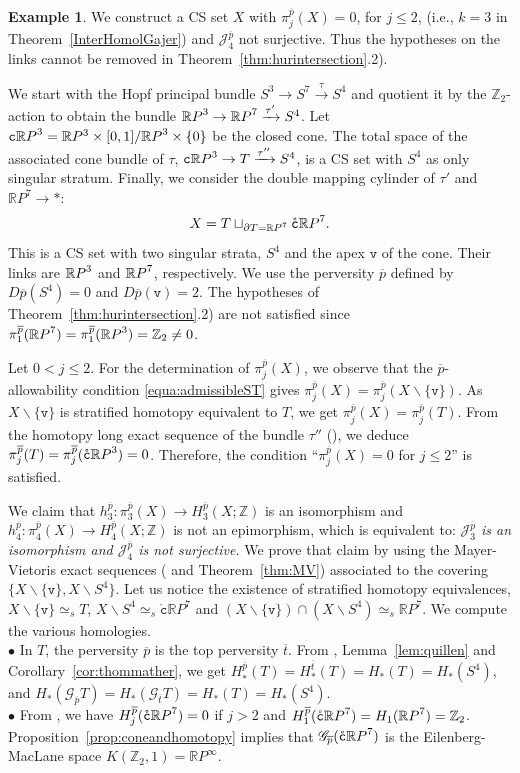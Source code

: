 \documentclass[a4paper,10pt,english,reqno]{amsart}
\theoremstyle{plain}
\theoremstyle{definition}
\newtheorem{example}[proposition]{Example}
\theoremstyle{remark}
\numberwithin{equation}{section}
\newcommand{\thmref}[1]{Theorem~\ref{#1}}
\newcommand{\propref}[1]{Proposition~\ref{#1}}
\newcommand{\lemref}[1]{Lemma~\ref{#1}}
\newcommand{\corref}[1]{Corollary~\ref{#1}}
\def\R{{\mathbb R}}
\def\ov{\overline}
\def\cJ{{\mathcal J}}
\def\crG{{\mathscr G}}
\def\tc{{\mathtt c}}
\def\tv{{\mathtt v}}
\def\R{\mathbb{R}}
\def\Z{\mathbb{Z}}
\def\RP{{\mathbb{R}{\rm P}}}
\def\rc{{\mathring{\tc}}}
\def\menos{\backslash}
\renewcommand\1{\hbox{\ding{192}}}
\renewcommand\2{\hbox{\ding{193}}}
\newcommand\3{\hbox{\ding{194}}}
\newcommand\4{\hbox{\ding{195}}}
\begin{document}
\begin{example}\label{exem:pashurewicz}
We construct a CS set $X$  with $\pi_{j}^{\ov{p}}(X)=0$, for $j\leq 2$, (i.e., $k=3$ in \thmref{InterHomolGajer})
and $\cJ^{\ov{p}}_{4}$ not surjective. Thus the hypotheses on the links cannot be removed in
\thmref{thm:hurintersection}.2). 

We start with the Hopf principal bundle $S^3 \to S^7  \xrightarrow{\tau}  S^4$ and  quotient it
by the $\Z_2$-action to obtain the bundle $\RP^3 \to \RP^7  \xrightarrow{\tau'} S^4$.
Let $\tc \RP^3=\R P^3\times [0,1]/\RP^3\times\{0\}$ be the closed cone.
The total space of the associated cone bundle of $\tau$,  $\tc \RP^3 \to T \xrightarrow{\tau''}  S^4$,
 is  a CS set with $S^4$ as  only singular stratum. 
Finally, we consider the double mapping cylinder of 
%
$\tau'$
and $\R P^7\to *$: 
$$
X = T \sqcup_{\partial T= \RP^7} \rc \RP^7.
$$
This is  a CS set with two singular strata, $S^4$ and the apex $\tv$ of the cone.
Their links are $\RP^3$ and  $\RP^7$, respectively.
 We use the  perversity $ \ov p$ defined by  $D\ov p (S^4) = 0$ and $D\ov p(\tv) = 2$.
 The hypotheses of \thmref{thm:hurintersection}.2) are not satisfied since
$
 \pi^{\ov p}_1(\RP^7) =  \pi^{\ov p}_1(\RP^3) = \Z_2\ne 0
 $.
 
 Let $0<j\leq 2$.
 For the determination of $\pi_{j}^{\ov{p}}(X)$, we observe that the
 $\ov p$-allowability condition  \eqref{equa:admissibleST} gives
$
\pi^{\ov p}_{j} (X) \stackrel {} = \pi^{\ov p}_{j}(X\menos \{\tv\} )$.
 As $X\menos\{\tv\}$ is stratified homotopy equivalent
to $T$, we get  $\pi^{\ov p}_{j} (X)= \pi^{\ov p}_{j}(T )$.
%
From the homotopy long exact sequence of the bundle $\tau''$ (\cite[Theorem 2.2]{MR1404919}), 
we deduce
$\pi_{j}^{\ov p} (T)=\pi_j^{\ov p} (\rc \RP^3)=0$. 
Therefore, the condition ``$\pi_{j}^{\ov p} (X)=0$ for $j\leq 2$''  is satisfied.

We claim that $h_{3}^{\ov{p}}\colon \pi_{3}^{\ov{p}}(X )\to {H}_{3}^{\ov{p}}(X;\Z)$ is  an isomorphism
and
$h_{4}^{\ov{p}}\colon \pi_{4}^{\ov{p}}(X )\to {H}_{4}^{\ov{p}}(X;\Z)$ is not an epimorphism, which is equivalent to:
 \emph{$  \cJ^{\ov{p}}_{3} $ is  an isomorphism and $  \cJ^{\ov{p}}_{4} $ is not surjective.}
We prove that claim by using the  Mayer-Vietoris exact sequences 
(\cite[Proposition 4.1]{CST3} and    \thmref{thm:MV}) 
associated to the covering $\{X \menos \{\tv\} , X\menos S^4\}$.
Let us notice the existence of stratified homotopy equivalences,
$X\menos \{\tv\}\simeq_{s} T$,
$X\menos S^4\simeq_{s}\rc \R P^7$
and
$(X\menos \{\tv\})\cap (X\menos S^4)\simeq_{s}\R P^7$.
We compute the various homologies.\\
$\bullet$ In $T$, the perversity $\ov{p}$ is the top perversity $\ov{t}$. 
%
From \cite[Proposition 5.4]{CST3}, \lemref{lem:quillen} and \corref{cor:thommather}, 
we get  $H^{\ov p}_*(T) = H_* ^{\ov t}(T) = H_{*}(T)=H_{*}(S^4)$,
%
and $H_*(\crG_{\ov p} T)  =  H_*(\crG_{\ov t} T)  = H_*( T) =H_{*}(S^4)$. \\
$\bullet$  From  \cite[Proposition 5.2]{CST3}, we have
$ H_j^{\ov p}(\rc \RP^7) = 0 $ if $j>2$ and $H_1^{\ov p}(\rc \RP^7)  =  H_{1}( \RP^7)=\Z_{2}$.
\propref{prop:coneandhomotopy} implies that $
 \crG_{\ov p} (\rc \RP^7)
 $ is the Eilenberg-MacLane space $K(\Z_2,1)=\R P^{\infty}$.
 

\end{example}
\end{document}
